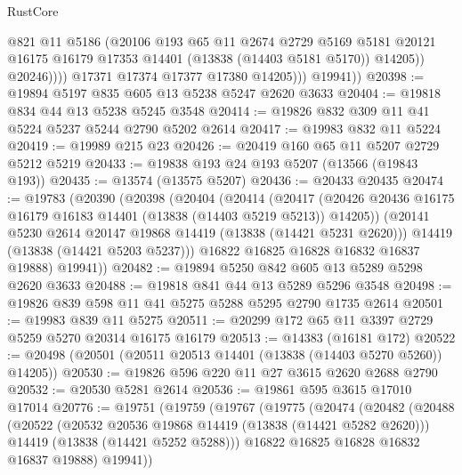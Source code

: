 \begin{lexlean}{RustCore}
\begin{coremodule}
                        @821
                        @11
                        @5186
                        (@20106
                          @193
                          @65
                          @11
                          @2674
                          @2729
                          @5169
                          @5181
                          @20121
                          @16175
                          @16179
                          @17353
                          @14401
                          (@13838 (@14403 @5181 @5170))
                          @14205))
                      @20246))))
              @17371
              @17374
              @17377
              @17380
              @14205)))
        @19941))
@20398 := @19894 @5197 @835 @605 @13 @5238 @5247 @2620 @3633
@20404 := @19818 @834 @44 @13 @5238 @5245 @3548
@20414 := @19826 @832 @309 @11 @41 @5224 @5237 @5244 @2790 @5202 @2614
@20417 := @19983 @832 @11 @5224
@20419 := @19989 @215 @23
@20426 := @20419 @160 @65 @11 @5207 @2729 @5212 @5219
@20433 := @19838 @193 @24 @193 @5207 (@13566 (@19843 @193))
@20435 := @13574 (@13575 @5207)
@20436 := @20433 @20435
@20474 := @19783
    (@20390
      (@20398
        (@20404
          (@20414
            (@20417
              (@20426 @20436 @16175 @16179 @16183 @14401 (@13838 (@14403 @5219 @5213)) @14205))
            (@20141 @5230 @2614 @20147 @19868 @14419 (@13838 (@14421 @5231 @2620)))
            @14419
            (@13838 (@14421 @5203 @5237)))
          @16822
          @16825
          @16828
          @16832
          @16837
          @19888)
        @19941))
@20482 := @19894 @5250 @842 @605 @13 @5289 @5298 @2620 @3633
@20488 := @19818 @841 @44 @13 @5289 @5296 @3548
@20498 := @19826 @839 @598 @11 @41 @5275 @5288 @5295 @2790 @1735 @2614
@20501 := @19983 @839 @11 @5275
@20511 := @20299 @172 @65 @11 @3397 @2729 @5259 @5270 @20314 @16175 @16179
@20513 := @14383 (@16181 @172)
@20522 := @20498 (@20501 (@20511 @20513 @14401 (@13838 (@14403 @5270 @5260)) @14205))
@20530 := @19826 @596 @220 @11 @27 @3615 @2620 @2688 @2790
@20532 := @20530 @5281 @2614
@20536 := @19861 @595 @3615 @17010 @17014
@20776 := @19751
    (@19759
      (@19767
        (@19775
          (@20474
            (@20482
              (@20488
                (@20522
                  (@20532 @20536 @19868 @14419 (@13838 (@14421 @5282 @2620)))
                  @14419
                  (@13838 (@14421 @5252 @5288)))
                @16822
                @16825
                @16828
                @16832
                @16837
                @19888)
              @19941))

\end{coremodule}
\end{lexlean}
